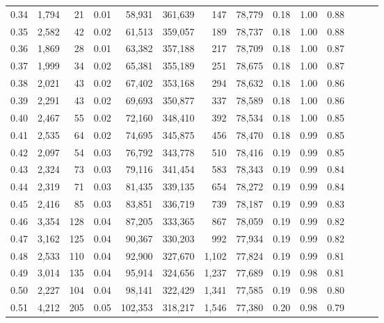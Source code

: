 \begin{tabular}{rrrrrrrrrrrrrr}
0.34 &   1,794 &     21 &  0.01 &   58,931 &  361,639 &     147 &  78,779 &  0.18 &  1.00 &      0.88 \\
0.35 &   2,582 &     42 &  0.02 &   61,513 &  359,057 &     189 &  78,737 &  0.18 &  1.00 &      0.88 \\
0.36 &   1,869 &     28 &  0.01 &   63,382 &  357,188 &     217 &  78,709 &  0.18 &  1.00 &      0.87 \\
0.37 &   1,999 &     34 &  0.02 &   65,381 &  355,189 &     251 &  78,675 &  0.18 &  1.00 &      0.87 \\
0.38 &   2,021 &     43 &  0.02 &   67,402 &  353,168 &     294 &  78,632 &  0.18 &  1.00 &      0.86 \\
0.39 &   2,291 &     43 &  0.02 &   69,693 &  350,877 &     337 &  78,589 &  0.18 &  1.00 &      0.86 \\
0.40 &   2,467 &     55 &  0.02 &   72,160 &  348,410 &     392 &  78,534 &  0.18 &  1.00 &      0.85 \\
0.41 &   2,535 &     64 &  0.02 &   74,695 &  345,875 &     456 &  78,470 &  0.18 &  0.99 &      0.85 \\
0.42 &   2,097 &     54 &  0.03 &   76,792 &  343,778 &     510 &  78,416 &  0.19 &  0.99 &      0.85 \\
0.43 &   2,324 &     73 &  0.03 &   79,116 &  341,454 &     583 &  78,343 &  0.19 &  0.99 &      0.84 \\
0.44 &   2,319 &     71 &  0.03 &   81,435 &  339,135 &     654 &  78,272 &  0.19 &  0.99 &      0.84 \\
0.45 &   2,416 &     85 &  0.03 &   83,851 &  336,719 &     739 &  78,187 &  0.19 &  0.99 &      0.83 \\
0.46 &   3,354 &    128 &  0.04 &   87,205 &  333,365 &     867 &  78,059 &  0.19 &  0.99 &      0.82 \\
0.47 &   3,162 &    125 &  0.04 &   90,367 &  330,203 &     992 &  77,934 &  0.19 &  0.99 &      0.82 \\
0.48 &   2,533 &    110 &  0.04 &   92,900 &  327,670 &   1,102 &  77,824 &  0.19 &  0.99 &      0.81 \\
0.49 &   3,014 &    135 &  0.04 &   95,914 &  324,656 &   1,237 &  77,689 &  0.19 &  0.98 &      0.81 \\
0.50 &   2,227 &    104 &  0.04 &   98,141 &  322,429 &   1,341 &  77,585 &  0.19 &  0.98 &      0.80 \\
0.51 &   4,212 &    205 &  0.05 &  102,353 &  318,217 &   1,546 &  77,380 &  0.20 &  0.98 &      0.79 \\

\end{tabular}
